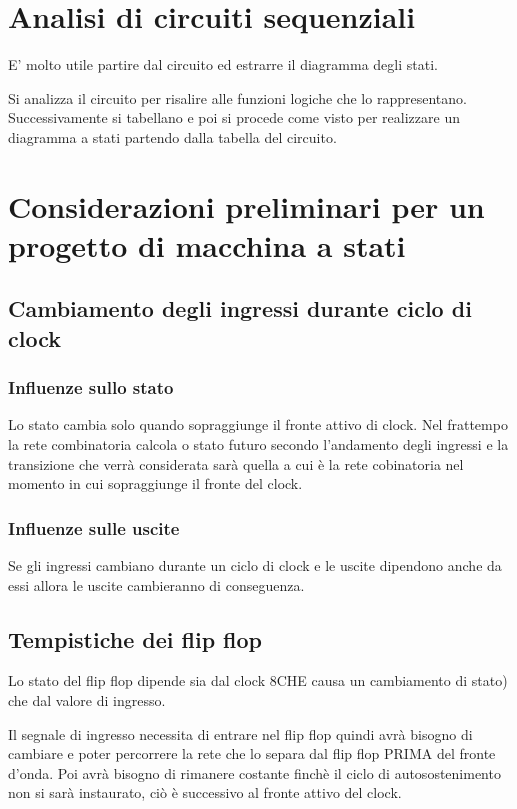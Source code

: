 \documentclass[a4paper]{book}
\begin{document}
\section{Analisi di circuiti sequenziali}

E' molto utile partire dal circuito ed estrarre il diagramma degli stati.

Si analizza il circuito per risalire alle funzioni logiche che lo rappresentano.
Successivamente si tabellano e poi si procede come visto per realizzare un diagramma a stati partendo dalla tabella del circuito.

\section{Considerazioni preliminari per un progetto di macchina a stati}

\subsection*{Cambiamento degli ingressi durante ciclo di clock}

\subsubsection{Influenze sullo stato}
Lo stato cambia solo quando sopraggiunge il fronte attivo di clock.
Nel frattempo la rete combinatoria calcola o stato futuro secondo l'andamento degli ingressi e la transizione che verrà considerata sarà quella a cui è la rete cobinatoria nel momento in cui sopraggiunge il fronte del clock.

\subsubsection{Influenze sulle uscite}

Se gli ingressi cambiano durante un ciclo di clock e le uscite dipendono anche da essi allora le uscite cambieranno di conseguenza.

\subsection{Tempistiche dei flip flop}

Lo stato del flip flop dipende sia dal clock 8CHE causa un cambiamento di stato) che dal valore di ingresso.

Il segnale di ingresso necessita di entrare nel flip flop quindi avrà bisogno di cambiare e poter percorrere la rete che lo separa dal flip flop PRIMA del fronte d'onda.
Poi avrà bisogno di rimanere costante finchè il ciclo di autosostenimento non si sarà instaurato, ciò è successivo al fronte attivo del clock.
\end{document}
